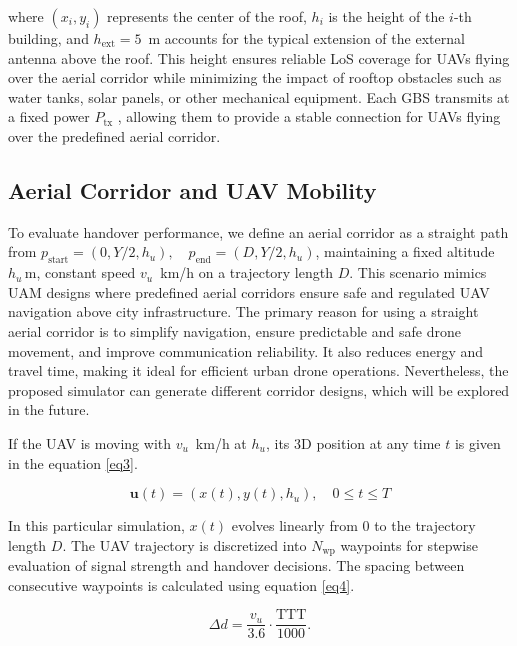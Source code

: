 \documentclass[10pt,conference]{IEEEtran}
\begin{document}
where $(x_i, y_i)$ represents the center of the roof, $h_i$ is the height of the $i$-th building, and $h_{\text{ext}} = 5$~m accounts for the typical extension of the external antenna above the roof. This height ensures reliable LoS coverage for UAVs flying over the aerial corridor while minimizing the impact of rooftop obstacles such as water tanks, solar panels, or other mechanical equipment. Each GBS transmits at a fixed power $P_{\mathrm{tx}}$%
, allowing them to provide a stable connection for UAVs flying over the predefined aerial corridor.

\subsection{Aerial Corridor and UAV Mobility}

To evaluate handover performance, we define an aerial corridor as a straight path from $p_{\text{start}} = (0, Y/2, h_u), \quad p_{\text{end}} = (D, Y/2, h_u)$,
maintaining a fixed altitude $h_u\,$m, constant speed $v_u$~km/h on a trajectory length $D$. This scenario mimics UAM designs where predefined aerial corridors ensure safe and regulated UAV navigation above city infrastructure. The primary reason for using a straight aerial corridor is to simplify navigation, ensure predictable and safe drone movement, and improve communication reliability. It also reduces energy and travel time, making it ideal for efficient urban drone operations. Nevertheless, the proposed simulator can generate different corridor designs, which will be explored in the future.  

If the UAV is moving with $v_u$~km/h at $h_u$, its 3D position at any time $t$ is given in the equation \eqref{eq3}. 

\begin{equation}
\label{eq3} 
\mathbf{u}(t) = (x(t), y(t), h_u), \quad 0 \le t \le T
\end{equation}

In this particular simulation, $x(t)$ evolves linearly from 0 to the trajectory length $D$. The UAV trajectory is discretized into $N_{\text{wp}}$ waypoints for stepwise evaluation of signal strength and handover decisions. The spacing between consecutive waypoints is calculated using equation \eqref{eq4}. 

\begin{equation}
\label{eq4} 
\Delta d = \frac{v_u}{3.6} \cdot \frac{\mathrm{TTT}}{1000}.
\end{equation}
\end{document}
